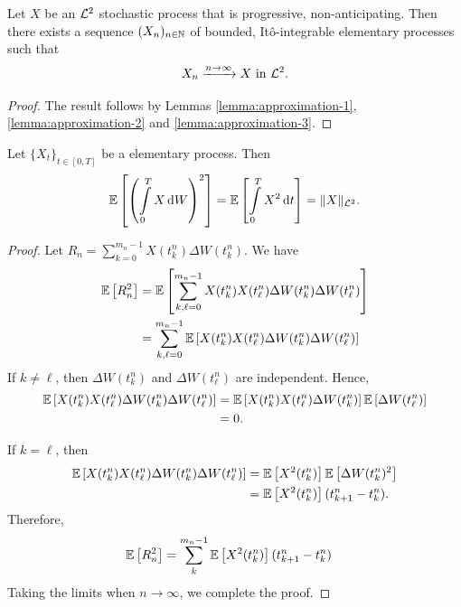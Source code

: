 \begin{theorem}
  Let $X$ be an $\mathcal{L}^2$ stochastic process that is progressive, non-anticipating. Then there exists a sequence $(X_n)_{n\in\mathbb{N}}$ of bounded, Itô-integrable elementary processes such that
  $$X_n \xrightarrow{n\to\infty} X \text{ in } \mathcal{L}^2.$$
\end{theorem}
\begin{proof}
  The result follows by Lemmas \ref{lemma:approximation-1}, \ref{lemma:approximation-2} and \ref{lemma:approximation-3}.
\end{proof}

\begin{lemma}
  \label{lemma:ito-isometry-for-elementary-process}
  Let $\{X_t\}_{t\in[0,T]}$ be a elementary process. Then
  $$\mathbb{E}\left[\left(\int\limits_0^T X\,\mathrm{d} W\right)^2\right] = \mathbb{E}\left[\int\limits_0^T X^2\,\mathrm{d} t\right] = \|X\|_{\mathcal{L}^2}.$$
\end{lemma}


\begin{proof}
  Let $R_n=\sum\limits_{k=0}^{m_n-1} X(t_k^n)\Delta W(t^n_{k})$. We have
  \begin{align*}
    \mathbb{E}\left[R_n^2\right]
     & = \mathbb{E}\left[\sum\limits_{k,\ell = 0}^{m_n-1}X(t_k^n)X(t_\ell^n)\Delta W(t^n_{k}) \Delta W(t^n_{\ell})\right] \\
     & = \sum\limits_{k,\ell = 0}^{m_n-1}\mathbb{E}\left[X(t_k^n)X(t_\ell^n)\Delta W(t^n_{k}) \Delta W(t^n_{\ell})\right]
  \end{align*}
  If $k \ne \ell$, then $\Delta W(t^n_{k})$ and $\Delta W(t^n_{\ell})$ are independent. Hence,
  \begin{align*}
    \mathbb{E}\left[X(t_k^n)X(t_\ell^n)\Delta W(t^n_{k}) \Delta W(t^n_{\ell})\right]
     & = \mathbb{E}\left[X(t_k^n)X(t_\ell^n)\Delta W(t^n_{k})\right]\mathbb{E}\left[\Delta W(t^n_{\ell})\right] \\
     & =0.
  \end{align*}

  If $k = \ell$, then
  \begin{align*}
    \mathbb{E}\left[X(t_k^n)X(t_\ell^n)\Delta W(t^n_{k}) \Delta W(t^n_{\ell})\right]
     & =\mathbb{E}\left[X^2(t_k^n)\right] \mathbb{E}\left[\Delta W(t^n_{k})^2\right] \\
     & = \mathbb{E}\left[X^2(t_k^n)\right] (t_{k+1}^n-t_k^n).
  \end{align*}
  Therefore,
  \begin{align*}
    \mathbb{E}\left[R_n^2\right]
     & =\sum\limits_{k}^{m_n-1} \mathbb{E}\left[X^2(t_k^n)\right] (t_{k+1}^n-t_k^n)
  \end{align*}
  Taking the limits when $n\to\infty$, we complete the proof.
\end{proof}

